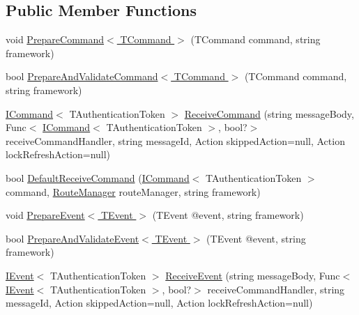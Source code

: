 \subsection*{Public Member Functions}
\begin{DoxyCompactItemize}
\item 
void \hyperlink{interfaceCqrs_1_1Azure_1_1ServiceBus_1_1IAzureBusHelper_ad25c4130a4357504cfccba49999493c7}{Prepare\+Command$<$ T\+Command $>$} (T\+Command command, string framework)
\item 
bool \hyperlink{interfaceCqrs_1_1Azure_1_1ServiceBus_1_1IAzureBusHelper_a283ee2cf9241a5364dd5569a9f12fa10}{Prepare\+And\+Validate\+Command$<$ T\+Command $>$} (T\+Command command, string framework)
\item 
\hyperlink{interfaceCqrs_1_1Commands_1_1ICommand}{I\+Command}$<$ T\+Authentication\+Token $>$ \hyperlink{interfaceCqrs_1_1Azure_1_1ServiceBus_1_1IAzureBusHelper_a16dd52eec62dd41df564bb25467b710d}{Receive\+Command} (string message\+Body, Func$<$ \hyperlink{interfaceCqrs_1_1Commands_1_1ICommand}{I\+Command}$<$ T\+Authentication\+Token $>$, bool?$>$ receive\+Command\+Handler, string message\+Id, Action skipped\+Action=null, Action lock\+Refresh\+Action=null)
\item 
bool \hyperlink{interfaceCqrs_1_1Azure_1_1ServiceBus_1_1IAzureBusHelper_a3c632e92e0e38110f9e7721fb31700d1}{Default\+Receive\+Command} (\hyperlink{interfaceCqrs_1_1Commands_1_1ICommand}{I\+Command}$<$ T\+Authentication\+Token $>$ command, \hyperlink{classCqrs_1_1Bus_1_1RouteManager}{Route\+Manager} route\+Manager, string framework)
\item 
void \hyperlink{interfaceCqrs_1_1Azure_1_1ServiceBus_1_1IAzureBusHelper_ab7d1fa5162adc0f01edcf9039bb43c2c}{Prepare\+Event$<$ T\+Event $>$} (T\+Event @event, string framework)
\item 
bool \hyperlink{interfaceCqrs_1_1Azure_1_1ServiceBus_1_1IAzureBusHelper_ac5cbeb6e8bbdb1a98501f0b746c12abd}{Prepare\+And\+Validate\+Event$<$ T\+Event $>$} (T\+Event @event, string framework)
\item 
\hyperlink{interfaceCqrs_1_1Events_1_1IEvent}{I\+Event}$<$ T\+Authentication\+Token $>$ \hyperlink{interfaceCqrs_1_1Azure_1_1ServiceBus_1_1IAzureBusHelper_a435d1d63e37ea149087f254f4b73b94a}{Receive\+Event} (string message\+Body, Func$<$ \hyperlink{interfaceCqrs_1_1Events_1_1IEvent}{I\+Event}$<$ T\+Authentication\+Token $>$, bool?$>$ receive\+Command\+Handler, string message\+Id, Action skipped\+Action=null, Action lock\+Refresh\+Action=null)
\item 

\end{DoxyCompactItemize}
